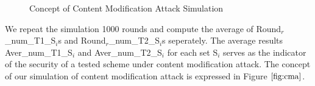 \documentclass{article}
\begin{document}
\begin{figure}[htbp]
 \centering
  \hspace{0in}
 \caption{Concept of Content Modification Attack Simulation}
 \label{fig:cma}
\end{figure}

We repeat the simulation 1000 rounds and compute the average of Round$_r$\_num\_T1\_S$_i$s and Round$_r$\_num\_T2\_S$_i$s seperately. The average results   Aver\_num\_T1\_S$_i$ and Aver\_num\_T2\_S$_i$ for each set S$_i$ serves as the indicator of the security of a tested scheme under content modification attack.
The concept of our simulation of content modification attack is expressed in Figure $\ref{fig:cma}$.
\end{document}
